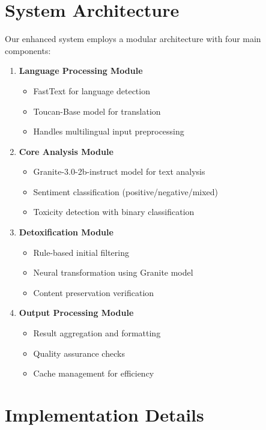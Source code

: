 \documentclass[11pt]{article}
\begin{document}
\section{System Architecture}
Our enhanced system employs a modular architecture with four main components:

\begin{enumerate}
    \item \textbf{Language Processing Module}
    \begin{itemize}
        \item FastText for language detection
        \item Toucan-Base model for translation
        \item Handles multilingual input preprocessing
    \end{itemize}
    
    \item \textbf{Core Analysis Module}
    \begin{itemize}
        \item Granite-3.0-2b-instruct model for text analysis
        \item Sentiment classification (positive/negative/mixed)
        \item Toxicity detection with binary classification
    \end{itemize}
    
    \item \textbf{Detoxification Module}
    \begin{itemize}
        \item Rule-based initial filtering
        \item Neural transformation using Granite model
        \item Content preservation verification
    \end{itemize}
    
    \item \textbf{Output Processing Module}
    \begin{itemize}
        \item Result aggregation and formatting
        \item Quality assurance checks
        \item Cache management for efficiency
    \end{itemize}
\end{enumerate}

\section{Implementation Details}
\end{document}
